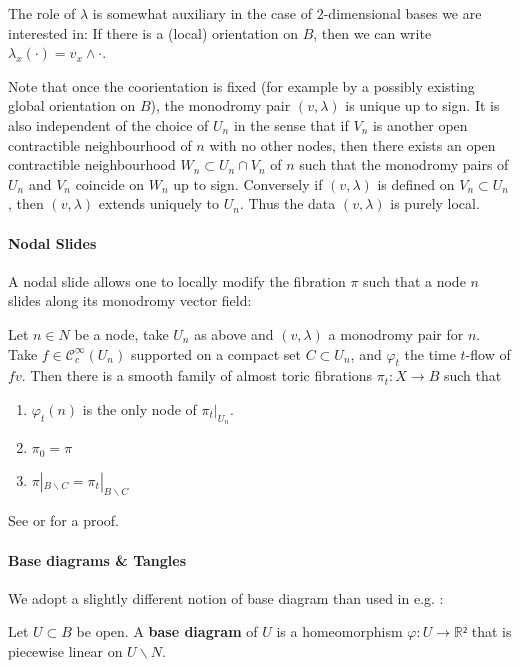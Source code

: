 \documentclass[12pt,a4paper,abstract=true,draft]{scrartcl}
\begin{document}
The role of $λ$ is somewhat auxiliary in the case of $2$-dimensional bases we are interested in: If there is a (local) orientation on $B$, then we can write $λ_x(·) = v_x ∧ ·$.

Note that once the coorientation is fixed (for example by a possibly existing global orientation on $B$), the monodromy pair $(v,λ)$ is unique up to sign.
It is also independent of the choice of $U_n$ in the sense that if $V_n$ is another open contractible neighbourhood of $n$ with no other nodes, then there exists an open contractible neighbourhood $W_n ⊂ U_n ∩ V_n$ of $n$ such that the monodromy pairs of $U_n$ and $V_n$ coincide on $W_n$ up to sign.
Conversely if $(v,λ)$ is defined on $V_n ⊂ U_n$, then $(v,λ)$ extends uniquely to $U_n$.
Thus the data $(v,λ)$ is purely local.

\paragraph{Nodal Slides}
A nodal slide allows one to locally modify the fibration $π$ such that a node $n$ slides along its monodromy vector field:

\begin{lemma}
  \label{thm:nodal_slide}
  Let $n ∈ N$ be a node, take $U_n$ as above and $(v,λ)$ a monodromy pair for $n$.
  Take $f ∈ 𝒞^∞_c(U_n)$ supported on a compact set $C ⊂ U_n$, and $φ_t$ the time $t$-flow of $fv$.
  Then there is a smooth family of almost toric fibrations $π_t \colon X → B$ such that
  \begin{enumerate}
    \item $φ_t(n)$ is the only node of $π_t|_{U_n}$.
    \item $π_0 = π$
    \item $π|_{B ∖ C} = π_t|_{B ∖ C}$
  \end{enumerate}
\end{lemma}

See \cite[Theorem 6.5]{symington2002FourDF} or \cite[Theorem 8.10]{evans2021atfs} for a proof.

\paragraph{Base diagrams \& Tangles}
We adopt a slightly different notion of base diagram than used in e.g. \cite{symington2002FourDF,evans2021atfs}:

\begin{definition}
  Let $U ⊂ B$ be open. A \textbf{base diagram} of $U$ is a homeomorphism $φ \colon U → ℝ²$ that is piecewise linear on $U ∖ N$.
\end{definition}
\end{document}
